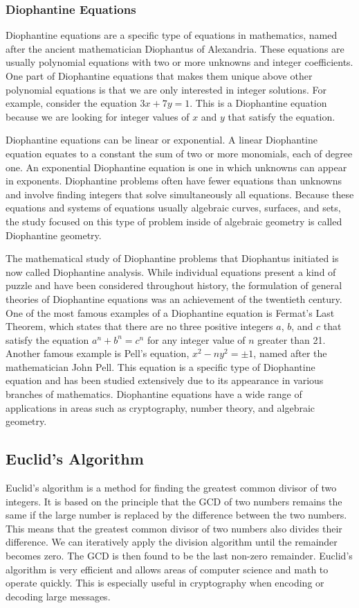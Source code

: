 \documentclass{article}
\renewcommand{\_}{\ifincsname_\else\legacyunderscore\fi}
\begin{document}
    \subsubsection*{Diophantine Equations}
    Diophantine equations are a specific type of equations in mathematics, named after the ancient mathematician Diophantus of Alexandria. These equations are usually polynomial equations with two or more unknowns and integer coefficients. One part of Diophantine equations that makes them unique above other polynomial equations is that we are only interested in integer solutions. For example, consider the equation $3x + 7y = 1$. This is a Diophantine equation because we are looking for integer values of $x$ and $y$ that satisfy the equation.

    
    Diophantine equations can be linear or exponential. A linear Diophantine equation equates to a constant the sum of two or more monomials, each of degree one. An exponential Diophantine equation is one in which unknowns can appear in exponents. Diophantine problems often have fewer equations than unknowns and involve finding integers that solve simultaneously all equations. Because these equations and systems of equations usually algebraic curves, surfaces, and sets, the study focused on this type of problem inside of algebraic geometry is called Diophantine geometry. 

    
    The mathematical study of Diophantine problems that Diophantus initiated is now called Diophantine analysis. While individual equations present a kind of puzzle and have been considered throughout history, the formulation of general theories of Diophantine equations was an achievement of the twentieth century. One of the most famous examples of a Diophantine equation is Fermat’s Last Theorem, which states that there are no three positive integers $a$, $b$, and $c$ that satisfy the equation $a^n + b^n = c^n$ for any integer value of $n$ greater than 21. Another famous example is Pell’s equation, $x^2 - ny^2 = \pm1$, named after the mathematician John Pell. This equation is a specific type of Diophantine equation and has been studied extensively due to its appearance in various branches of mathematics. Diophantine equations have a wide range of applications in areas such as cryptography, number theory, and algebraic geometry.

    \subsection*{Euclid's Algorithm}
    Euclid's algorithm is a method for finding the greatest common divisor of two integers. It is based on the principle that the GCD of two numbers remains the same if the large number is replaced by the difference between the two numbers. This means that the greatest common divisor of two numbers also divides their difference. We can iteratively apply the division algorithm until the remainder becomes zero. The GCD is then found to be the last non-zero remainder. Euclid's algorithm is very efficient and allows areas of computer science and math to operate quickly. This is especially useful in cryptography when encoding or decoding large messages. 
\end{document}
